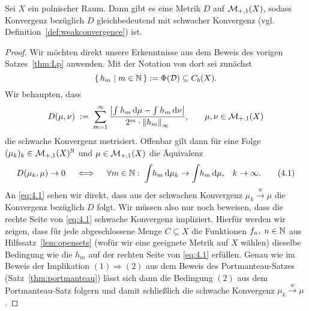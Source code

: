 \documentclass[../main/main.tex]{subfiles}
\begin{document}
	\begin{Satz}
		\label{thm:weakconvergencemetrizable}
		Sei $X$ ein polnischer Raum. Dann gibt es eine Metrik $D$ auf $\mathcal{M}_{+,1}(X)$, 
		sodass Konvergenz bezüglich $D$ gleichbedeutend mit schwacher Konvergenz 
		(vgl. Definition~\ref{def:weakconvergence}) ist.
	\end{Satz}
	
	\begin{proof}
		Wir möchten direkt unsere Erkenntnisse aus dem Beweis des vorigen 
		Satzes~\ref{thm:Lp} anwenden. Mit der Notation von dort sei zunächst 
		\[\left\{\, h_m \; \middle| \; m \in \mathbb{N} \,\right\} \vcentcolon = \Phi(\mathcal{D}) \subseteq C_b(X) \text{.}\] 
		Wir behaupten, dass
		\[D(\mu, \nu) \; \vcentcolon = \; \sum_{m=1}^{\infty} \frac{\left| \int_{} \, h_m \, \mathrm{d}\mu - 
				\int_{} \, h_m \, \mathrm{d}\nu \right|}{2^m \cdot \left\lVert h_m\right\rVert_\infty} \text{,} 
		\qquad \mu, \nu \in \mathcal{M}_{+,1}(X) \]
		die schwache Konvergenz metrisiert. Offenbar gilt dann für eine Folge 
		$(\mu_k)_k \in \mathcal{M}_{+,1}(X)^{\mathbb{N}}$ und $\mu \in \mathcal{M}_{+,1}(X)$ die 
		Äquivalenz
		\[ D(\mu_k, \mu) \to 0 \quad \iff \quad \forall m \in \mathbb{N}: \; 
		\int_{} \, h_m \, \mathrm{d}\mu_k \to \int_{} \, h_m \, \mathrm{d}\mu\text{,} 
		\quad k \to \infty \text{.} \label{eq:4.1} \tag{4.1} \]
		An \eqref{eq:4.1} sehen wir direkt, dass aus der schwachen Konvergenz 
		$\mu_k \xrightarrow{w} \mu$ die Konvergenz bezüglich $D$ folgt. Wir 
		müssen also nur noch beweisen, dass die rechte Seite von \eqref{eq:4.1} 
		schwache Konvergenz impliziert. Hierfür werden wir zeigen, dass für jede 
		abgeschlossene Menge $C \subseteq X$ die Funktionen $f_n, \; n \in \mathbb{N}$ aus 
		Hilfssatz~\ref{lem:opensets} (wofür wir eine geeignete Metrik auf $X$ wählen) 
		dieselbe Bedingung wie die $h_m$ auf der rechten Seite von \eqref{eq:4.1} 
		erfüllen. Genau wie im Beweis der Implikation $(1) \Rightarrow (2)$ aus dem 
		Beweis des Portmanteau-Satzes (Satz~\ref{thm:portmanteau}) lässt sich dann 
		die Bedingung $(2)$ aus dem Portmanteau-Satz folgern und damit schließlich 
		die schwache Konvergenz $\mu_k \xrightarrow{w} \mu$.
		

\end{proof}
\end{document}
